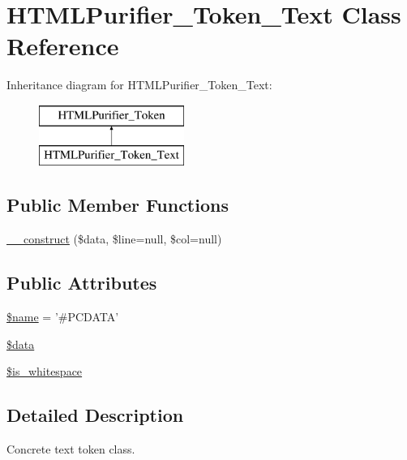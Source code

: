 \hypertarget{classHTMLPurifier__Token__Text}{\section{H\+T\+M\+L\+Purifier\+\_\+\+Token\+\_\+\+Text Class Reference}
\label{classHTMLPurifier__Token__Text}
}
Inheritance diagram for H\+T\+M\+L\+Purifier\+\_\+\+Token\+\_\+\+Text\+:\begin{figure}[H]
\begin{center}
\leavevmode
\includegraphics[height=2.000000cm]{classHTMLPurifier__Token__Text}
\end{center}
\end{figure}
\subsection*{Public Member Functions}
\begin{DoxyCompactItemize}
\item 
\hyperlink{classHTMLPurifier__Token__Text_ab121849fdd2ef306ee62a4782b76812e}{\+\_\+\+\_\+construct} (\$data, \$line=null, \$col=null)
\end{DoxyCompactItemize}
\subsection*{Public Attributes}
\begin{DoxyCompactItemize}
\item 
\hyperlink{classHTMLPurifier__Token__Text_a2e1a60c76a85960d81f9e74f2fd2f294}{\$name} = '\#P\+C\+D\+A\+T\+A'
\item 
\hyperlink{classHTMLPurifier__Token__Text_ad77402c8b1972c3397cd154ec5b7c9bb}{\$data}
\item 
\hyperlink{classHTMLPurifier__Token__Text_aabc9a269015ae9b3e370a15ee5de621f}{\$is\+\_\+whitespace}
\end{DoxyCompactItemize}


\subsection{Detailed Description}
Concrete text token class.

